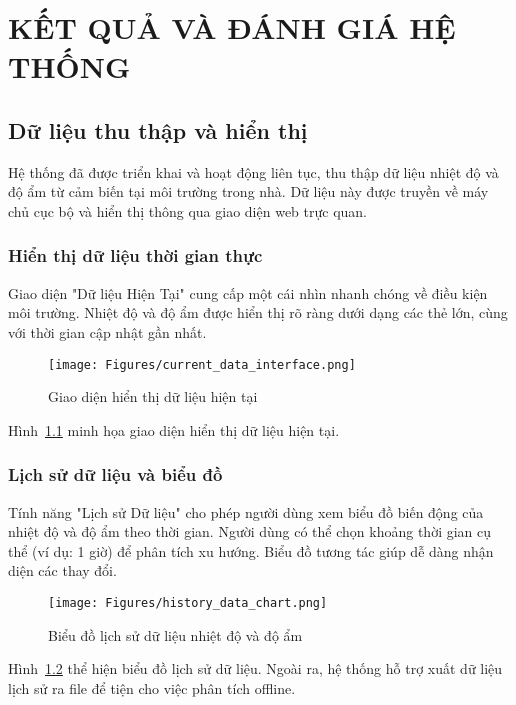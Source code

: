 
\chapter{KẾT QUẢ VÀ ĐÁNH GIÁ HỆ THỐNG} %

\label{Chapter3} %


\section{Dữ liệu thu thập và hiển thị}
Hệ thống đã được triển khai và hoạt động liên tục, thu thập dữ liệu nhiệt độ và độ ẩm từ cảm biến  tại môi trường trong nhà. Dữ liệu này được truyền về máy chủ cục bộ và hiển thị thông qua giao diện web trực quan.

\subsection{Hiển thị dữ liệu thời gian thực}
Giao diện "Dữ liệu Hiện Tại" cung cấp một cái nhìn nhanh chóng về điều kiện môi trường. Nhiệt độ và độ ẩm được hiển thị rõ ràng dưới dạng các thẻ lớn, cùng với thời gian cập nhật gần nhất.

\begin{figure}[hbtp]
	\centering
	\texttt{[image: Figures/current\_data\_interface.png]} %
	\caption{Giao diện hiển thị dữ liệu hiện tại}
	\label{fig:current_data}
\end{figure}
Hình~\ref{fig:current_data} minh họa giao diện hiển thị dữ liệu hiện tại.

\subsection{Lịch sử dữ liệu và biểu đồ}
Tính năng "Lịch sử Dữ liệu" cho phép người dùng xem biểu đồ biến động của nhiệt độ và độ ẩm theo thời gian. Người dùng có thể chọn khoảng thời gian cụ thể (ví dụ: 1 giờ) để phân tích xu hướng. Biểu đồ tương tác giúp dễ dàng nhận diện các thay đổi.

\begin{figure}[hbtp]
	\centering
	\texttt{[image: Figures/history\_data\_chart.png]} %
	\caption{Biểu đồ lịch sử dữ liệu nhiệt độ và độ ẩm}
	\label{fig:history_data}
\end{figure}
Hình~\ref{fig:history_data} thể hiện biểu đồ lịch sử dữ liệu. Ngoài ra, hệ thống hỗ trợ xuất dữ liệu lịch sử ra file  để tiện cho việc phân tích offline.

